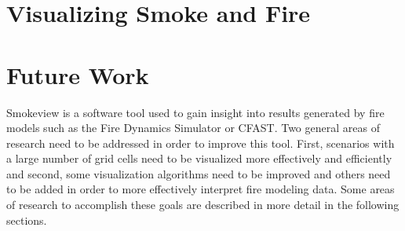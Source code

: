 \documentclass[11pt,twoside]{book}
\begin{document}


%
%

\chapter{Visualizing Smoke and Fire}

\newcommand{\citesmv}{\cite{Smokeview_Users_Guide}}
\newcommand{\paper}{chapter}

%
%

\chapter{Future Work}

Smokeview is a software tool used to gain insight into results
generated by fire models such as the Fire Dynamics Simulator or
CFAST. Two general areas of research need to be addressed in order
to improve this tool. First, scenarios with a large number of grid
cells need to be visualized more effectively and efficiently and
second, some visualization algorithms need to be improved and
others need to be added in order to more effectively interpret
fire modeling data. Some areas of research to accomplish these
goals are described in more detail in the following sections.

%
%
\end{document}
